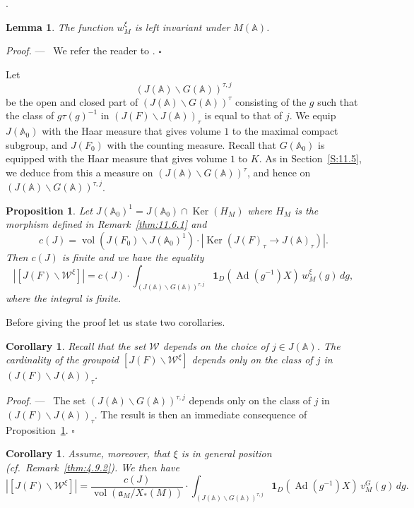 \documentclass[12pt,a4paper,oneside,english,leqno]{smfart}
\makeatletter
\numberwithin{equation}{subsection}
\newcounter{theo}
\numberwithin{theo}{subsection}
\newenvironment{paragr}[1][]{\medskip\refstepcounter{subsection}%
  \par\noindent\hspace*{\parindent}\thesubsection.\ \emph{#1}%
  \@ifundefined{@empty}{}{}\ignorespaces}{\medskip}
\theoremstyle{plain}
\newtheorem{lemma}[theo]{Lemma}
\newtheorem{proposition}[theo]{Proposition}
\newtheorem{corollary}[theo]{Corollary}
\theoremstyle{definition}
\theoremstyle{remark}
\newenvironment{preuve}[1][]{\medskip\noindent\textit{Proof.} #1 ---\ }%
  {\hfill\ensuremath{\square}\medskip}
\DeclareMathOperator{\vol}{vol}
\DeclareMathOperator{\Ad}{Ad}
\DeclareMathOperator{\Ker}{Ker}
\newcommand{\AAA}{\mathbb{A}}
\newcommand{\wc}{\mathcal{W}}
\newcommand{\ago}{\mathfrak{a}}
\newcommand{\back}{\backslash}
\makeatother
\begin{document}
\begin{paragr}
\begin{lemma}\label{thm:12.2.1}
The function $w_M^\xi$ is left invariant under $M(\AAA)$.
\end{lemma}

\begin{preuve}
We refer the reader to \cite[Lemma~11.7.1]{LFPI}.
\end{preuve}

Let
$$
(J(\AAA)\back G(\AAA))^{\tau,j}
$$
be the open and closed part of $(J(\AAA)\back G(\AAA))^\tau$ consisting of the $g$ such that the class of $g\tau(g)^{-1}$ in $(J(F)\back J(\AAA))_\tau$ is equal to that of $j$. We equip $J(\AAA_0)$ with the Haar measure that gives volume $1$ to the maximal compact subgroup, and $J(F_0)$ with the counting measure. Recall that $G(\AAA_0)$ is equipped with the Haar measure that gives volume $1$ to $K$. As in Section~\ref{S:11.5}, we deduce from this a measure on $(J(\AAA)\back G(\AAA))^\tau$, and hence on $(J(\AAA)\back G(\AAA))^{\tau,j}$.

\begin{proposition}\label{thm:12.2.2}
Let $J(\AAA_0)^1=J(\AAA_0)\cap\Ker(H_M)$ where $H_M$ is the morphism defined in Remark~\ref{thm:11.6.1} and
\begin{equation}\label{eq:12.2.4}
c(J)=\vol(J(F_0)\back J(\AAA_0)^1)\cdot|\Ker(J(F)_\tau\to J(\AAA)_\tau)|.
\end{equation}
Then $c(J)$ is finite and we have the equality
$$
|[J(F)\back\wc^\xi]|=c(J)\cdot\int_{(J(\AAA)\back G(\AAA))^{\tau,j}} \mathbf{1}_D(\Ad(g^{-1})X)\,w_M^\xi(g)\,dg,
$$
where the integral is finite.
\end{proposition}

Before giving the proof let us state two corollaries.

\begin{corollary}\label{thm:12.2.3}
Recall that the set $\wc$ depends on the choice of $j\in J(\AAA)$. The cardinality of the groupoid $[J(F)\back\wc^\xi]$ depends only on the class of $j$ in $(J(F)\back J(\AAA))_\tau$.
\end{corollary}

\begin{preuve}
The set $(J(\AAA)\back G(\AAA))^{\tau,j}$ depends only on the class of $j$ in $(J(F)\back J(\AAA))_\tau$. The result is then an immediate consequence of Proposition~\ref{thm:12.2.2}.
\end{preuve}

\begin{corollary}\label{thm:12.2.4}
Assume, moreover, that $\xi$ is in general position (cf.\ Remark~\ref{thm:4.9.2}). We then have
$$
|[J(F)\back\wc^\xi]|=\frac{c(J)}{\vol(\ago_M/X_*(M))}\cdot \int_{(J(\AAA)\back G(\AAA))^{\tau,j}}\mathbf{1}_D(\Ad(g^{-1})X)\,v_M^G(g)\,dg.
$$
\end{corollary}


\end{paragr}
\end{document}
